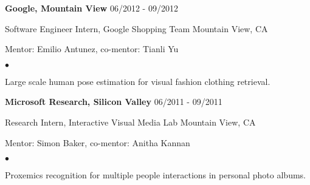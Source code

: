 \documentclass[margin]{res3}
\newenvironment{list1}{
  \begin{list}{\ding{113}}{%
      \setlength{\itemsep}{0.03in}
      \setlength{\parsep}{0in} \setlength{\parskip}{0in}
      \setlength{\topsep}{0in} \setlength{\partopsep}{0in}
      \setlength{\leftmargin}{0in}}}{\end{list}}
\newenvironment{list2}{
  \begin{list}{$\bullet$}{%
      \setlength{\itemsep}{0.02in}
      \setlength{\parsep}{0in} \setlength{\parskip}{0in}
      \setlength{\topsep}{0in} \setlength{\partopsep}{0in}
      \setlength{\leftmargin}{0.2in}}}{\end{list}}
\begin{document}
\begin{resume}
\begin{list1}
\item[] {\bf Google, Mountain View} \hfill {06/2012 - 09/2012}
\vspace{-2pt}
\item[] Software Engineer Intern, Google Shopping Team \hfill {Mountain View, CA}
\vspace{-2pt}
\item[] Mentor: Emilio Antunez, co-mentor: Tianli Yu 

\begin{list2}
\item Large scale human pose estimation for visual fashion clothing retrieval.	
\end{list2}
\vspace{5pt}


\item[] {\bf Microsoft Research, Silicon Valley} \hfill {06/2011 - 09/2011}
\vspace{-2pt}
\item[] Research Intern, Interactive Visual Media Lab \hfill{Mountain View, CA}
\vspace{-2pt}
\item[] Mentor: Simon Baker, co-mentor: Anitha Kannan

\begin{list2}
\item Proxemics recognition for multiple people interactions in personal photo albums.
\end{list2}
\vspace{5pt}



\end{list1}
\end{resume}
\end{document}
